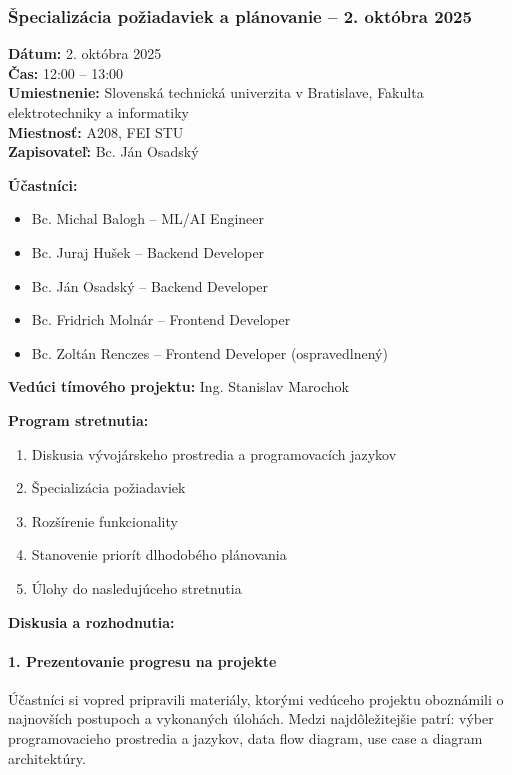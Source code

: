 \subsubsection{Špecializácia požiadaviek a plánovanie – 2. októbra 2025}

\textbf{Dátum:} 2. októbra 2025 \\
\textbf{Čas:} 12:00 – 13:00 \\
\textbf{Umiestnenie:} Slovenská technická univerzita v Bratislave, Fakulta elektrotechniky a informatiky \\
\textbf{Miestnosť:} A208, FEI STU \\
\textbf{Zapisovateľ:} Bc. Ján Osadský

\vspace{0.5cm}
\textbf{Účastníci:}
\begin{itemize}
    \item Bc. Michal Balogh – ML/AI Engineer
    \item Bc. Juraj Hušek – Backend Developer
    \item Bc. Ján Osadský – Backend Developer
    \item Bc. Fridrich Molnár – Frontend Developer
    \item Bc. Zoltán Renczes – Frontend Developer (ospravedlnený)
\end{itemize}

\textbf{Vedúci tímového projektu:} Ing. Stanislav Marochok

\vspace{0.5cm}
\textbf{Program stretnutia:}
\begin{enumerate}
    \item Diskusia vývojárskeho prostredia a programovacích jazykov
    \item Špecializácia požiadaviek
    \item Rozšírenie funkcionality
    \item Stanovenie priorít dlhodobého plánovania
    \item Úlohy do nasledujúceho stretnutia
\end{enumerate}

\vspace{0.5cm}
\textbf{Diskusia a rozhodnutia:}

\paragraph{1. Prezentovanie progresu na projekte}
Účastníci si vopred pripravili materiály, ktorými vedúceho projektu oboznámili o najnovších postupoch a vykonaných úlohách. Medzi najdôležitejšie patrí: výber programovacieho prostredia a jazykov, data flow diagram, use case a diagram architektúry.

